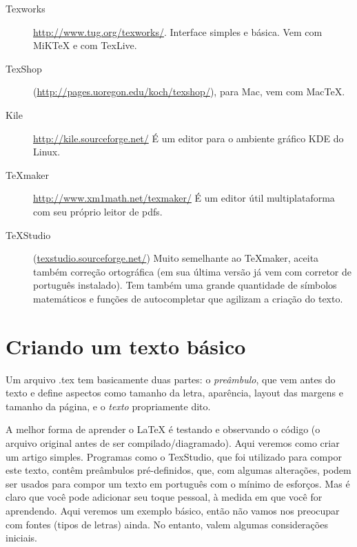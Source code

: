 \documentclass[a4paper,nols,bidi,nohyper,nobib]{tufte-book}
\begin{document}
\begin{description}

\item[Texworks] \url{http://www.tug.org/texworks/}. Interface simples e básica. Vem com MiKTeX e com TexLive.

\item [TexShop] (\url{http://pages.uoregon.edu/koch/texshop/}), para Mac, vem com MacTeX.

\item [Kile] \url{http://kile.sourceforge.net/}
É um editor para o ambiente gráfico KDE do Linux.

\item [TeXmaker] \url{http://www.xm1math.net/texmaker/}
É um editor útil multiplataforma com seu próprio leitor de pdfs.

\item  [TeXStudio] (\url{texstudio.sourceforge.net/})
Muito semelhante ao TeXmaker, aceita também correção ortográfica (em sua última versão já vem com corretor de português instalado). Tem também uma grande quantidade de símbolos matemáticos e funções de autocompletar que agilizam a criação do texto.

\end{description}

\chapter{Criando um texto básico}

Um arquivo .tex tem basicamente duas partes: o \textit{preâmbulo}, que vem antes do texto e define aspectos como tamanho da letra, aparência, layout das margens e tamanho da página, e o \textit{texto} propriamente dito.

A melhor forma de aprender o \LaTeX{} é testando e observando o código (o arquivo original antes de ser compilado/diagramado). Aqui veremos como criar um artigo simples. Programas como o TexStudio, que foi utilizado para compor este texto, contêm preâmbulos pré-definidos, que, com algumas alterações, podem ser usados para compor um texto em português com o mínimo de esforços. Mas é claro que você pode adicionar seu toque pessoal, à medida em que você for aprendendo. Aqui veremos um exemplo básico, então não vamos nos preocupar com fontes (tipos de letras) ainda. No entanto, valem algumas considerações iniciais.
\end{document}

